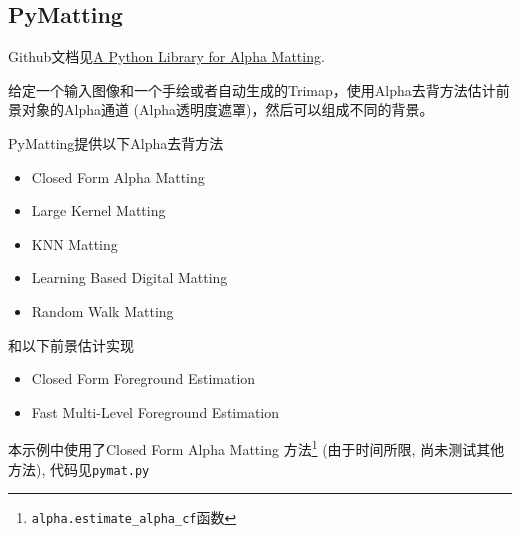 \documentclass[scheme=chinese,a4paper]{article}
\begin{document}


\subsection{PyMatting}
Github文档见\href{https://github.com/pymatting/pymatting}{A Python Library for Alpha Matting}\cite{germer2020pymatting}. 

给定一个输入图像和一个手绘或者自动生成的Trimap，使用Alpha去背方法估计前景对象的Alpha通道 (Alpha透明度遮罩)，然后可以组成不同的背景。

PyMatting提供以下Alpha去背方法
\begin{itemize}
  \item Closed Form Alpha Matting
  \item Large Kernel Matting 
  \item KNN Matting
  \item Learning Based Digital Matting
  \item Random Walk Matting
\end{itemize}
和以下前景估计实现
\begin{itemize}
  \item Closed Form Foreground Estimation 
  \item Fast Multi-Level Foreground Estimation 
\end{itemize}

本示例中使用了Closed Form Alpha Matting\cite{4359322} 方法\footnote{\lstinline{alpha.estimate_alpha_cf}函数} (由于时间所限, 尚未测试其他方法), 代码见\lstinline{pymat.py}
\end{document}
